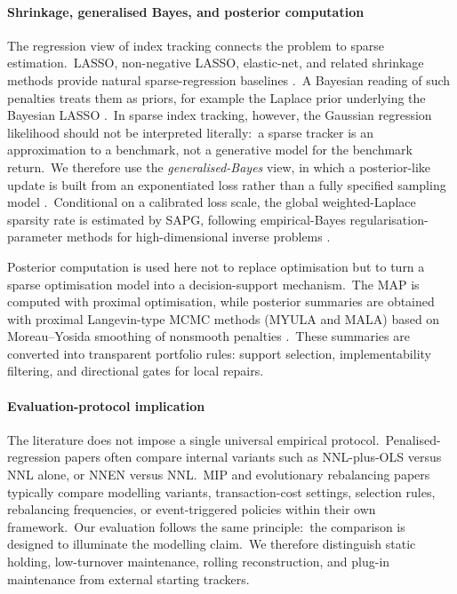 \documentclass[11pt]{article}
\begin{document}
\paragraph{Shrinkage, generalised Bayes, and posterior computation}

The regression view of index tracking connects the problem to sparse estimation.\ LASSO, non-negative LASSO, elastic-net, and related shrinkage methods provide natural sparse-regression baselines \cite{tibshirani1996regression, Zou2005elastic,wu2014nonnegativelasso,wu2014nonnegativeEN}.\ A Bayesian reading of such penalties treats them as priors, for example the Laplace prior underlying the Bayesian LASSO \cite{ParkCasella2008}.\ In sparse index tracking, however, the Gaussian regression likelihood should not be interpreted literally:\ a sparse tracker is an approximation to a benchmark, not a generative model for the benchmark return.\ We therefore use the \emph{generalised-Bayes} view, in which a posterior-like update is built from an exponentiated loss rather than a fully specified sampling model \cite{bissiri2016general}.\ Conditional on a calibrated loss scale, the global weighted-Laplace sparsity rate is estimated by SAPG, following empirical-Bayes regularisation-parameter methods for high-dimensional inverse problems \cite{Vidal2020}.

Posterior computation is used here not to replace optimisation but to turn a sparse optimisation model into a decision-support mechanism.\ The MAP is computed with proximal optimisation, while posterior summaries are obtained with proximal Langevin-type MCMC methods (MYULA and MALA) based on Moreau--Yosida smoothing of nonsmooth penalties \cite{pereyra2016proximal, DurmusMoulinesPereyra2018, Zygalakis2019}.\ These summaries are converted into transparent portfolio rules: support selection, implementability filtering, and directional gates for local repairs.

\paragraph{Evaluation-protocol implication}

The literature does not impose a single universal empirical protocol.\ Penalised-regression papers often compare internal variants such as NNL-plus-OLS versus NNL alone, or NNEN versus NNL.\ MIP and evolutionary rebalancing papers typically compare modelling variants, transaction-cost settings, selection rules, rebalancing frequencies, or event-triggered policies within their own framework.\ Our evaluation follows the same principle:\ the comparison is designed to illuminate the modelling claim.\ We therefore distinguish static holding, low-turnover maintenance, rolling reconstruction, and plug-in maintenance from external starting trackers.\ 
\end{document}
